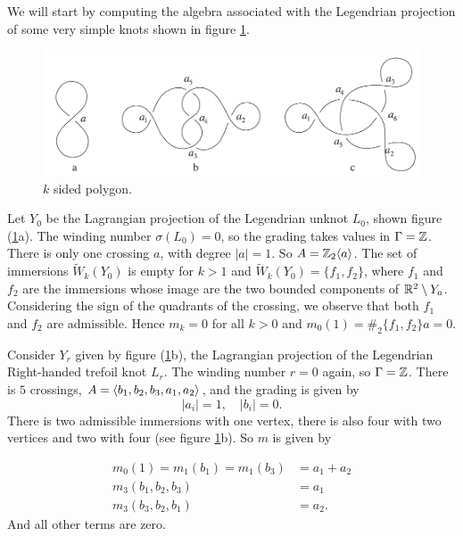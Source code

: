 

We will start by computing the \Ainf algebra associated with the Legendrian
projection of some very simple knots shown in figure \ref{fig:simple_knots}. 

\begin{figure}
\centering
\includegraphics[width=.8\textwidth]{figs/simple_knots.pdf}
\caption{$k$ sided polygon.}
\label{fig:simple_knots}
\end{figure}

\begin{exmp} Let $Y_0$ be the Lagrangian projection of the Legendrian unknot
$L_0$, shown figure (\ref{fig:simple_knots}a). The winding number $\sigma(L_0) =
0$, so the grading takes values in $\Gamma = \mathbb{Z}$. There is only one crossing
$a$, with degree $|a| = 1$. So $A = \mathbb{Z}_2\langle a \rangle$. The set of immersions
$\tilde{W}_k(Y_0)$ is empty for $k > 1$ and $\tilde{W}_k(Y_0) = \{ f_1, f_2 \}$,
where $f_1$ and $f_2$ are the immersions whose image are the two bounded
components of $\mathbb{R}^2 \setminus Y_a$. Considering the sign of the quadrants of the
crossing, we observe that both $f_1$ and $f_2$ are admissible. Hence $m_k = 0$
for all $k>0$ and $m_0(1) = \#_2\{f_1,f_2\} a = 0$.
\end{exmp}

\begin{exmp}
Consider $Y_r$ given by figure (\ref{fig:simple_knots}b), the Lagrangian
projection of the Legendrian Right-handed trefoil knot $L_r$. The winding number
$r=0$ again, so $\Gamma = \mathbb{Z}$. There is $5$ crossings, $A = \langle b_1, b_2, b_3,
a_1, a_2 \rangle$, and the grading is given by
\[ |a_i| = 1, \quad |b_i| = 0. \]
There is two admissible immersions with one vertex, there is also four with two
vertices and two with four (see figure \ref{fig:simple_knots}b). So $m$ is given
by

\begin{align*}
m_0(1) = m_1(b_1) = m_1(b_3) &= a_1 + a_2 \\
m_3(b_1,b_2,b_3) &= a_1 \\
m_3(b_3,b_2,b_1) &= a_2.
\end{align*}
And all other terms are zero.

\end{exmp}



